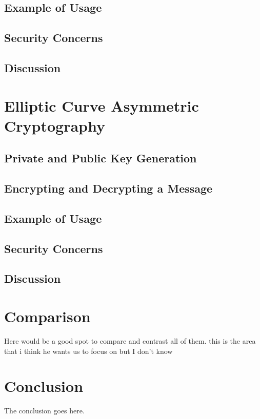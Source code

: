 \documentclass[conference]{IEEEtran}
\begin{document}
\subsection{Example of Usage}

\color{red}
\subsection{Security Concerns}

\subsection{Discussion}

\section{Elliptic Curve Asymmetric Cryptography}

\subsection{Private and Public Key Generation}

\subsection{Encrypting and Decrypting a Message}

\subsection{Example of Usage}

\subsection{Security Concerns}
\subsection{Discussion}



\section{Comparison}
Here would be a good spot to compare and contrast all of them. this is the area that i think he wants us to focus on but I don't know


\section{Conclusion}
The conclusion goes here.
\end{document}
